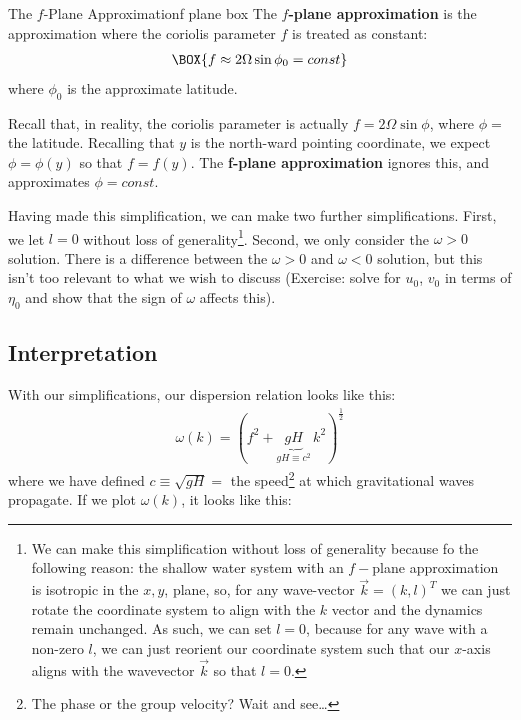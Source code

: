 \begin{fact}{The $f$-Plane Approximation}{f plane box}\label{f plane box}
    The \textbf{$f$-plane approximation} is the approximation where the coriolis parameter $f$ is treated as constant:
    \begin{align*}
        \BOX{f\approx2\Omega\sin\phi_0=const}
    \end{align*}
    where $\phi_0$ is the approximate latitude.
    
    Recall that, in reality, the coriolis parameter is actually $f=2\Omega \sin \phi$, where $\phi=$ the latitude. Recalling that $y$ is the north-ward pointing coordinate, we expect $\phi=\phi(y)$ so that $f=f(y)$. The \textbf{f-plane approximation} ignores this, and approximates $\phi=const$.
\end{fact}

Having made this simplification, we can make two further simplifications. First, we let $l=0$ without loss of generality\footnote{
    We can make this simplification without loss of generality because fo the following reason: the shallow water system with an $f-$plane approximation is isotropic in the $x,y$, plane, so, for any wave-vector $\vec{k}=(k,l)^T$ we can just rotate the coordinate system to align with the $k$ vector and the dynamics remain unchanged. As such, we can set $l=0$, because for any wave with a non-zero $l$, we can just reorient our coordinate system such that our $x$-axis aligns with the wavevector $\vec{k}$ so that $l=0$.
}. Second, we only consider the $\omega>0$ solution. There is a difference between the $\omega>0$ and $\omega<0$ solution, but this isn't too relevant to what we wish to discuss (Exercise: solve for $u_0$, $v_0$ in terms of $\eta_0$ and show that the sign of $\omega$ affects this).

\subsection{Interpretation}

With our simplifications, our dispersion relation looks like this:
\begin{align*}
    \omega(k)=(f^2+\underbrace{gH}_{gH\equiv c^2}\, k^2)^{\frac{1}{2}}
\end{align*}
where we have defined $c\equiv \sqrt{gH}=$ the speed\footnote{The phase or the group velocity? Wait and see\dots} at which gravitational waves propagate. If we plot $\omega(k)$, it looks like this:

